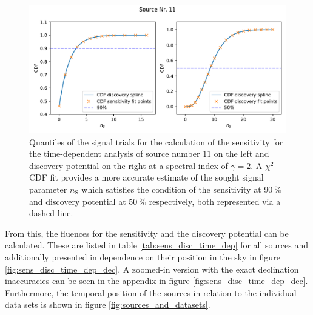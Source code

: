 \begin{figure}
    \centering
    \includegraphics[width=\linewidth]{Plots/05_csky/9_years_gfu_gold_time_dep_cdf_1.pdf}
    \caption{Quantiles of the signal trials for the calculation of the sensitivity for the time-dependent analysis of source number $\num{11}$ on the left and discovery potential on the right at a spectral index of $\gamma=\num{2}$. A $\chi^2$ CDF fit provides a more accurate estimate of the sought signal parameter $n_\text{S}$ which satisfies the condition of the sensitivity at $\SI{90}{\percent}$ and discovery potential at $\SI{50}{\percent}$ respectively, both represented via a dashed line.}
    \label{fig:time_dep_cdf_sens_disc_1}
\end{figure}
From this, the fluences for the sensitivity and the discovery potential can be calculated.
These are listed in table \ref{tab:sens_disc_time_dep} for all sources and additionally presented in dependence on their position in the sky in figure \ref{fig:sens_disc_time_dep_dec}.
A zoomed-in version with the exact declination inaccuracies can be seen in the appendix in figure \ref{fig:sens_disc_time_dep_dec}.
Furthermore, the temporal position of the sources in relation to the individual data sets is shown in figure \ref{fig:sources_and_datasets}.
